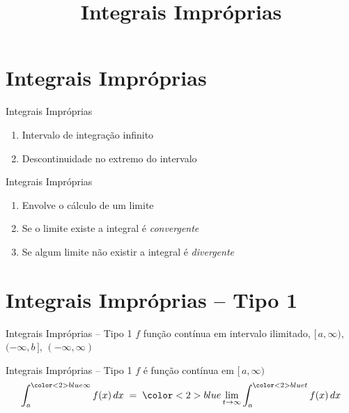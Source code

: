 \documentclass[fleqn,utf8,aspectratio=169,12pt]{beamer}
\title{Integrais Impróprias}
\begin{document}
\addtitle

\section{Integrais Impróprias}

\begin{frame}{Integrais Impróprias}
\begin{enumerate}[<+->]
  \setlength\itemsep{1em}
  \item Intervalo de integração infinito
  \item Descontinuidade no extremo do intervalo
\end{enumerate}
\end{frame}

\begin{frame}{Integrais Impróprias}
\begin{enumerate}[<+->]
  \setlength\itemsep{1em}
  \item Envolve o cálculo de um limite
  \item Se o limite existe a integral é \emph{convergente}
  \item Se algum limite não existir a integral é \emph{divergente}
\end{enumerate}
\end{frame}

\section{Integrais Impróprias -- Tipo 1}

\begin{frame}{Integrais Impróprias -- Tipo 1}
  $f$ função contínua em intervalo ilimitado,
  \emph{\([\,a, \infty)\)},
  \emph{\((-\infty, b\,]\)},
  \emph{\((-\infty, \infty)\)}
\end{frame}

\begin{frame}{Integrais Impróprias -- Tipo 1}
  $f$ é função contínua em \([\,a, \infty)\)
  \large
  \[
    \int_a^{{\color<2>{blue} \infty}} f(x) \, dx
    \;=\;  {{\color<2>{blue} \lim_{t\to\infty}}}
    \int_a^{{\color<2>{blue} t}} f(x)  \, dx
  \]
\end{frame}
\end{document}
